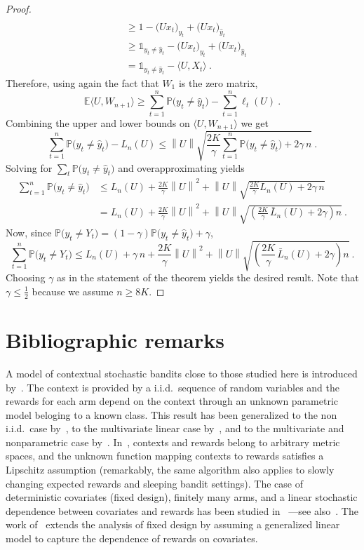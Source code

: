 \documentclass[11pt]{hackednow}
\renewcommand{\P}{\mathbb{P}}
\newcommand{\E}{\mathbb{E}}
\def\ds1{\mathds{1}}
\newcommand{\wh}{\widehat}
\newcommand{\inner}[2]{\bigl\langle{#1},{#2}\bigr\rangle}
\newcommand{\norm}[1]{\left\|{#1}\right\|}
\newcommand{\yhat}{\wh{y}}
\begin{document}
\begin{proof}
\begin{align*}
\\ &\ge
    1 - \bigl(Ux_t\bigr)_{y_t} + \bigl(Ux_t\bigr)_{\yhat_t}
\\ &\ge
    \ds1_{y_t \neq \yhat_t} - \bigl(Ux_t\bigr)_{y_t} + \bigl(Ux_t\bigr)_{\yhat_t}
\\ &=
    \ds1_{y_t \neq \yhat_t} - \inner{U}{X_t}~.
\end{align*}
Therefore, using again the fact that $W_1$ is the zero matrix,
\[
    \E\inner{U}{W_{n+1}} \ge \sum_{t=1}^n \P\bigl(y_t \neq \yhat_t\bigr) - \sum_{t=1}^n \ell_t(U)~.
\]
Combining the upper and lower bounds on $\inner{U}{W_{n+1}}$ we get
\[
    \sum_{t=1}^n \P\bigl(y_t \neq \yhat_t\bigr) - L_n(U)
\le
    \norm{U}\sqrt{\frac{2K}{\gamma}\sum_{t=1}^n \P\bigl(y_t \neq \yhat_t\bigr) + 2\gamma\,n}~.
\]
Solving for $\sum_t \P\bigl(y_t \neq \yhat_t\bigr)$ and overapproximating yields
\begin{align*}
    \sum_{t=1}^n \P\bigl(y_t \neq \yhat_t\bigr)
&\le
    L_n(U) + \frac{2K}{\gamma}\norm{U}^2 + \norm{U}\sqrt{\frac{2K}{\gamma} L_n(U) + 2\gamma\,n}
\\ &=
    L_n(U) + \frac{2K}{\gamma}\norm{U}^2 + \norm{U}\sqrt{\left(\frac{2K}{\gamma}\,\bar{L}_n(U) + 2\gamma\right)n}~.
\end{align*}
Now, since $\P\bigl(y_t \neq Y_t\bigr) = (1-\gamma)\P\bigl(y_t \neq \yhat_t\bigr) + \gamma$,
\[
    \sum_{t=1}^n \P\bigl(y_t \neq Y_t\bigr)
\le
    L_n(U) + \gamma\,n + \frac{2K}{\gamma}\norm{U}^2 + \norm{U}\sqrt{\left(\frac{2K}{\gamma}\,\bar{L}_n(U) + 2\gamma\right)n}~.
\]
Choosing $\gamma$ as in the statement of the theorem yields the desired result.
Note that $\gamma \le \tfrac{1}{2}$ because we assume $n \ge 8K$.
\end{proof}


\section{Bibliographic remarks} \label{sec:contextual}
A model of contextual stochastic bandits close to those studied here is introduced by~\cite{wang2005bandit}. The context is provided by a i.i.d.\ sequence of random variables and the rewards for each arm depend on the context through an unknown parametric model beloging to a known class. This result has been generalized to the non i.i.d.\ case by~\cite{wang2005arbitrary}, to the multivariate linear case by~\cite{RT10}, and to the multivariate and nonparametric case by~\cite{PR11}. In~\cite{slivkins2009contextual}, contexts and rewards belong to arbitrary metric spaces, and the unknown function mapping contexts to rewards satisfies a Lipschitz assumption (remarkably, the same algorithm also applies to slowly changing expected rewards and sleeping bandit settings). The case of deterministic covariates (fixed design), finitely many arms, and a linear stochastic dependence between covariates and rewards has been studied in~\cite{Aue02,chu2011contextual} ---see also~\cite{abe1999associative}. The work of~\cite{filippi2010parametric} extends the analysis of fixed design by assuming a generalized linear model to capture the dependence of rewards on covariates.
\end{document}
